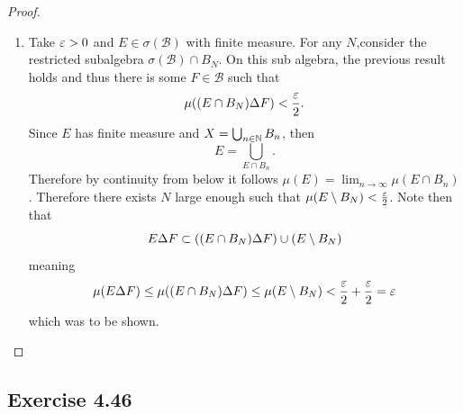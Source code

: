 \documentclass[hw_all.tex]{subfiles}
\begin{document}
\begin{proof}
\begin{enumerate}
\begin{itemize}
                \item 
                    Let $E_n \in \mathcal{C}^\N$ be non-increasing and $E = \bigcap_{n \in \N} E_n$. Since $\mu(X) < \infty$, the sequence $E_n^c$ and $E^c$ match the above criteria, thus there is some $F \in \mathcal{B}$ such that $\mu(E^c \Delta F) < \eps$. Note then that $\mu(E \Delta F^c) = \mu(E^c \Delta F) < \eps$ which can be done again since $\mu(X) < \infty$. Thus $E \in \mathcal{C}$ as $F^c \in \mathcal{B}$.
            \end{itemize} 

            Therefore $\mathcal{C}$ is a monotone class that is generated by $\mathcal{B}$, thus $\mathcal{C} = \sigma(\mathcal{B})$ meaning every set in $\sigma(\mathcal{B})$ has the desired property.

        \item 
            Take $\varepsilon > 0$ and $E \in \sigma(\mathcal{B})$ with finite measure. For any $N$,consider the restricted subalgebra $\sigma(\mathcal{B}) \cap B_N$. On this sub algebra, the previous result holds and thus there is some $F \in \mathcal{B}$ such that
            \[
                \mu((E \cap B_N) \Delta F) < \frac{\varepsilon}{2}
            .\]
            Since $E$ has finite measure and $X = \bigcup_{n \in \mathbb{N}} B_n$, then
            \[
                E = \bigcup_{E \cap B_n}
            .\]
            Therefore by continuity from below it follows $\mu(E) = \lim_{n \to \infty} \mu(E \cap B_n)$. Therefore there exists $N$ large enough such that $\mu(E \setminus B_N) < \frac{\varepsilon}{2}$. Note then that
            \[
                E \Delta F \subset \qty(\qty(E \cap B_N) \Delta F) \cup (E \setminus B_N)
            \]
            meaning
            \[
                \mu(E \Delta F) \leq \mu((E \cap B_N) \Delta F) \leq \mu(E \setminus B_N) < \frac{\varepsilon}{2} + \frac{\varepsilon}{2} = \varepsilon
            \]
            which was to be shown.
    \end{enumerate}
\end{proof}

\subsection{Exercise 4.46}
\end{document}
